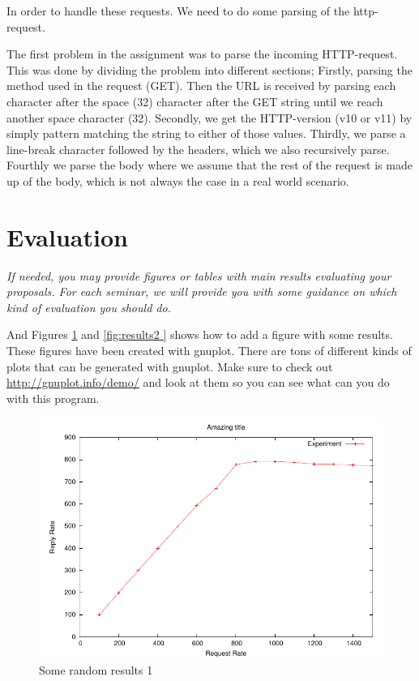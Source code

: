 \documentclass[a4paper, 11pt]{article}
\begin{document}
In order to handle these requests. We need to do some parsing of the http-request.

The first problem in the assignment was to parse the incoming HTTP-request. This was done by dividing the problem into different sections;
Firstly, parsing the method used in the request (GET). Then the URL is received by parsing each character after the space (32) character after the GET string until we reach another space character (32).
Secondly, we get the HTTP-version (v10 or v11) by simply pattern matching the string to either of those values.
Thirdly, we parse a line-break character followed by the headers, which we also recursively parse.
Fourthly we parse the body where we assume that the rest of the request is made up of the body, which is not always the case in a real world scenario.

\section{Evaluation}

\textit{If needed, you may provide figures or tables with main results
  evaluating your proposals. For each seminar, we will provide you
  with some guidance on which kind of evaluation you should do.}

And Figures \ref{fig:results1} and \ref{fig:results2 } shows how to
add a figure with some results. These figures have been created with
gnuplot. There are tons of different kinds of plots that can be
generated with gnuplot. Make sure to check out
\url{http://gnuplot.info/demo/} and look at them so you can see what
can you do with this program.


\begin{figure}
  \begin{center}
    \includegraphics{results1.pdf}
    \caption{Some random results 1}
    \label{fig:results1}
  \end{center}
\end{figure}
\end{document}
